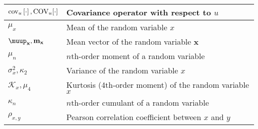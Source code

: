 \begin{xltabular}{\textwidth}{XX}
	\(\cov[u]{\cdot}, \textnormal{COV}_u[\cdot]\)                                                                                                & Covariance operator with respect to \(u\)                                                                                                                               \\ \hline
	\(\mu_x\)                                                                                                                                    & Mean of the random variable \(x\)                                                                                                                                       \\ \hline
	\(\boldsymbol{\muup}_\mathbf{x}, \mathbf{m}_\mathbf{x}\)                                                                                     & Mean vector of the random variable \(\mathbf{x}\) \cite{brownIntroductionRandomSignals1997}                                                                             \\ \hline
	\(\mu_n\)                                                                                                                                    & \(n\)th-order moment of a random variable                                                                                                                               \\ \hline
	\(\sigma_x^2, \kappa_2\)                                                                                                                     & Variance of the random variable \(x\)                                                                                                                                   \\ \hline
	\(\mathcal{K}_x, \mu_4\)                                                                                                                     & Kurtosis (4th-order moment) of the random variable \(x\)                                                                                                                \\ \hline
	\(\kappa_n\)                                                                                                                                 & \(n\)th-order cumulant of a random variable                                                                                                                             \\ \hline
	\(\rho_{x,y}\)                                                                                                                               & Pearson correlation coefficient between \(x\) and \(y\)                                                                                                                 \\ \hline

\end{xltabular}

